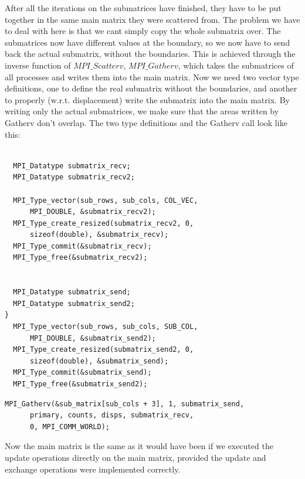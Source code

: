 \documentclass[11pt]{article}
\begin{document}
After all the iterations on the submatrices have finished, they have to be put together in the same main matrix they were scattered from. The problem we have to deal with here is that we
cant simply copy the whole submatrix over. The submatrices now have different values at the boundary, so we now have to send back the actual submatrix, without the boundaries. This is achieved 
through the inverse function of $MPI\_Scatterv$, $MPI\_Gatherv$, which takes the submatrices of all processes and writes them into the main matrix. Now we need two vector type definitions, one to define the
real submatrix without the boundaries, and another to properly (w.r.t. displacement) write the submatrix into the main matrix. By writing only the actual submatrices, we make sure that the areas written by 
Gatherv don't overlap. The two type definitions and the Gatherv call look like this:\\
\vspace{1 cm}
\begin{lstlisting}[label=some-code, caption=Receive vector types definition]
  
  MPI_Datatype submatrix_recv;
  MPI_Datatype submatrix_recv2;

  MPI_Type_vector(sub_rows, sub_cols, COL_VEC, 
      MPI_DOUBLE, &submatrix_recv2);
  MPI_Type_create_resized(submatrix_recv2, 0, 
      sizeof(double), &submatrix_recv);
  MPI_Type_commit(&submatrix_recv);
  MPI_Type_free(&submatrix_recv2);

  
  MPI_Datatype submatrix_send;
  MPI_Datatype submatrix_send2;
}
  MPI_Type_vector(sub_rows, sub_cols, SUB_COL, 
      MPI_DOUBLE, &submatrix_send2);
  MPI_Type_create_resized(submatrix_send2, 0, 
      sizeof(double), &submatrix_send);
  MPI_Type_commit(&submatrix_send);
  MPI_Type_free(&submatrix_send2);
\end{lstlisting}

	
\begin{lstlisting}[label=some-code, caption=$MPI\_Gatherv$ call]
  MPI_Gatherv(&sub_matrix[sub_cols + 3], 1, submatrix_send, 
      primary, counts, disps, submatrix_recv,
      0, MPI_COMM_WORLD);
\end{lstlisting}

Now the main matrix is the same as it would have been if we executed the update operations directly on the main matrix, provided the update and exchange operations were implemented correctly.\\
\end{document}
